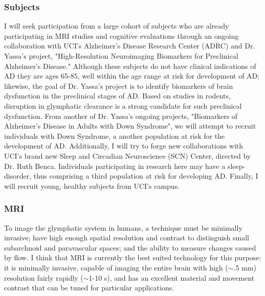 \subsubsection*{Subjects}
I will seek participation from a large cohort of subjects who are already participating in MRI studies and cognitive evaluations through an ongoing collaboration with UCI's Alzheimer's Disease Research Center (ADRC) and Dr. Yassa's project, "High-Resolution Neuroimaging Biomarkers for Preclinical Alzheimer’s Disease." Although these subjects do not have clinical indications of AD they are ages 65-85, well within the age range at risk for development of AD; likewise, the goal of Dr. Yassa's project is to identify biomarkers of brain dysfunction in the preclinical stages of AD. Based on studies in rodents, disruption in glymphatic clearance is a strong candidate for such preclinical dysfunction. From another of Dr. Yassa's ongoing projects, "Biomarkers of Alzheimer’s Disease in Adults with Down Syndrome", we will attempt to recruit individuals with Down Syndrome, a another population at risk for the development of AD. Additionally, I will try to forge new collaborations with UCI's brand new Sleep and Circadian Neuroscience (SCN) Center, directed by Dr. Ruth Benca. Individuals participating in research here may have a sleep-disorder, thus comprising a third population at risk for developing AD. Finally, I will recruit young, healthy subjects from UCI's campus. 

\subsubsection*{MRI}
To image the glymphatic system in humans, a technique must be minimally invasive; have high enough spatial resolution and contrast to distinguish small subarchnoid and paravascular spaces; and the ability to measure changes caused by flow. I think that MRI is currently the best suited technology for this purpose: it is minimally invasive, capable of imaging the entire brain with high ($\sim$.5 mm) resolution fairly rapidly ($\sim$1-10 s), and has an excellent material and movement contrast that can be tuned for particular applications.

